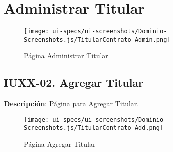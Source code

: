 \section{Administrar Titular} \label{sec:cf-ui-admin-titularcontrato}

\begin{figure}[H]
        \label{tab:ui-search-titularcontrato-page}
        \texttt{[image: ui-specs/ui-screenshots/Dominio-Screenshots.js/TitularContrato-Admin.png]}
        \caption{P\'agina Administrar Titular}
\end{figure}
\clearpage
\subsection{IUXX-02. Agregar Titular} \label{sec:ui-page-create-titularcontrato}

\textbf{Descripci\'on}: P\'agina para Agregar Titular.\\

\begin{figure}[H]
	\label{tab:ui-create-titularcontrato-page}
	\texttt{[image: ui-specs/ui-screenshots/Dominio-Screenshots.js/TitularContrato-Add.png]}
	\caption{P\'agina Agregar Titular}
\end{figure}

